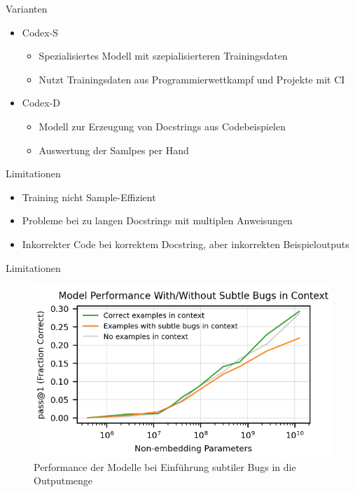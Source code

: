 \documentclass{beamer}              %
\begin{document}
\begin{frame}{Varianten}
\begin{itemize}
    \item Codex-S\cite{chen2021evaluating}
    \begin{itemize}
        \item Spezialisiertes Modell mit szepialisierteren Trainingsdaten
        \item Nutzt Trainingsdaten aus Programmierwettkampf und Projekte mit CI
    \end{itemize}
    \item Codex-D\cite{chen2021evaluating}
    \begin{itemize}
        \item Modell zur Erzeugung von Docstrings aus Codebeispielen
        \item Auswertung der Samlpes per Hand
    \end{itemize}
\end{itemize}
\end{frame}

\begin{frame}{Limitationen}
\begin{itemize}
    \item Training nicht Sample-Effizient
    \item Probleme bei zu langen Docstrings mit multiplen Anweisungen
    \item Inkorrekter Code bei korrektem Docstring, aber inkorrekten Beispieloutputs
\end{itemize}
\end{frame}

\begin{frame}{Limitationen}
    \begin{figure}
        \centering
        \includegraphics[width=0.6\paperwidth]{images/bugsinexamples.png}
        \caption{Performance der Modelle bei Einführung subtiler Bugs in die Outputmenge\cite{chen2021evaluating}}
    \end{figure}
\end{frame}
\end{document}
